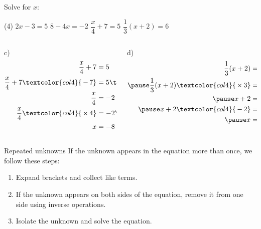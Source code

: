 \documentclass[aspectratio=169,10pt]{beamer}
\begin{document}
\addtocounter{example}{-1}
\begin{frame}
  \begin{example}
    Solve for $x$:
    \begin{tasks}(4)
      \task $2x-3=5$
      \task $8-4x=-2$
      \task $\dfrac{x}{4}+7=5$
      \task $\dfrac{1}{3}(x+2)=6$
    \end{tasks}
  \end{example}
  \begin{solution}[]
    \vspace{-1em}
    \begin{columns}[t]
      \begin{column}{.4\textwidth}
    c) $ $\vspace{-1em}\[
      \begin{aligned}
         \frac{x}{4}+7&=5\\
         \frac{x}{4}+7\textcolor{col4}{\,-\,7}&=5\textcolor{col4}{\,-\,7}\\
         \frac{x}{4}&=-2\\
         \frac{x}{4}\textcolor{col4}{\,\times\,4}&=-2\textcolor{col4}{\,\times\,4}\\
         x&=-8
      \end{aligned}
      \]
    \end{column}
      \begin{column}{.4\textwidth}
    d) $ $\vspace{-2em}\[
      \begin{aligned}
         \frac{1}{3}(x+2)&=6\\\pause
         \frac{1}{3}(x+2)\textcolor{col4}{\,\times\,3}&=6\textcolor{col4}{\,\times\,3}\\\pause
         x+2&=18\\\pause
         x+2\textcolor{col4}{\,-\,2}&=18\textcolor{col4}{\,-\,2}\\\pause
         x&=16
      \end{aligned}
      \]
    \end{column}
  \end{columns}
  \end{solution}
\end{frame}

\begin{frame}{Repeated unknowns}\pause
If the unknown appears in the equation more than once, we follow these steps:\pause
\begin{enumerate}
	\item Expand brackets and collect like terms.\pause
	\item If the unknown appears on both sides of the equation, remove it from one side using inverse operations.\pause
	\item Isolate the unknown and solve the equation.
\end{enumerate}
\end{frame}
\end{document}
